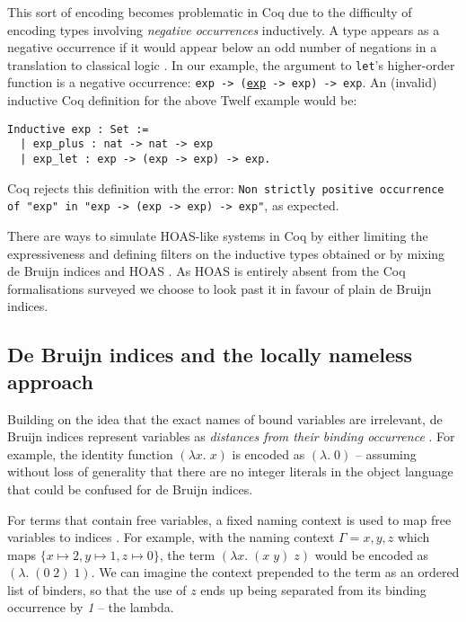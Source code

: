 \documentclass[]{unswthesis}
\begin{document}
This sort of encoding becomes problematic in Coq due to the difficulty of encoding types involving \textit{negative occurrences} inductively. A type appears as a negative occurrence if it would appear below an odd number of negations in a translation to classical logic \cite{tapl}. In our example, the argument to \texttt{let}'s higher-order function is a negative occurrence: \texttt{exp -> (\underline{exp} -> exp) -> exp}. An (invalid) inductive Coq definition for the above Twelf example would be:

\begin{verbatim}
Inductive exp : Set :=
  | exp_plus : nat -> nat -> exp
  | exp_let : exp -> (exp -> exp) -> exp.
\end{verbatim}

Coq rejects this definition with the error: \texttt{Non strictly positive occurrence of "exp" in
 "exp -> (exp -> exp) -> exp"}, as expected.
 
There are ways to simulate HOAS-like systems in Coq by either limiting the expressiveness and defining filters on the inductive types obtained \cite{despeyroux95} or by mixing de Bruijn indices and HOAS \cite{capretta07}. As HOAS is entirely absent from the Coq formalisations surveyed we choose to look past it in favour of plain de Bruijn indices.

\subsection{De Bruijn indices and the locally nameless approach}
\label{sec:de_bruijn}

Building on the idea that the exact names of bound variables are irrelevant, de Bruijn indices represent variables as \textit{distances from their binding occurrence} \cite{deBruijn72}. For example, the identity function $(\lambda x. \; x)$ is encoded as $(\lambda . \; 0)$ -- assuming without loss of generality that there are no integer literals in the object language that could be confused for de Bruijn indices.

For terms that contain free variables, a fixed naming context is used to map free variables to indices \cite{tapl}. For example, with the naming context $\Gamma = x, y, z$ which maps $\{x \mapsto 2, y \mapsto 1, z \mapsto 0\}$, the term $(\lambda x. \; (x \; y) \; z)$ would be encoded as $(\lambda. \; (0 \; 2) \; 1)$. We can imagine the context prepended to the term as an ordered list of binders, so that the use of $z$ ends up being separated from its binding occurrence by \textit{1} -- the lambda.
\end{document}
